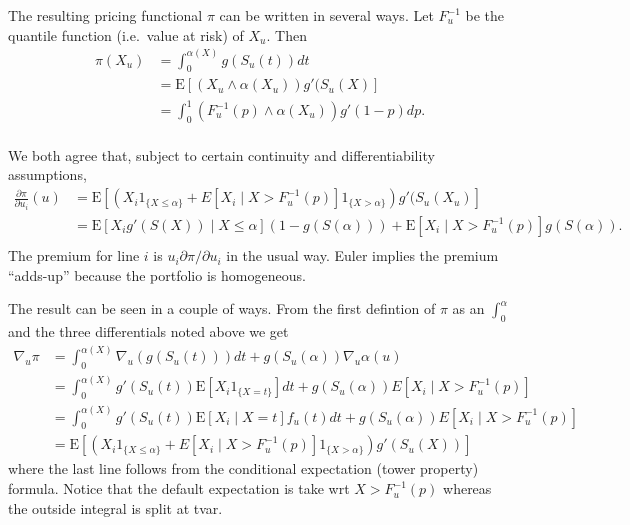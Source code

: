 The resulting pricing functional \(\pi\) can be written in several ways.
Let \(F_u^{-1}\) be the quantile function (i.e.~value at risk) of
\(X_u\). Then \[
\begin{align}
\pi(X_u) &= \int_0^{\alpha(X)} g(S_u(t))dt \\
&= \text{E}[(X_u\wedge \alpha(X_u)) g'(S_u(X)] \\
&= \int_0^1 (F_u^{-1}(p)\wedge \alpha(X_u)) g'(1-p)dp. \\
\end{align}
\]

We both agree that, subject to certain continuity and differentiability
assumptions, \[
\begin{align}
\frac{\partial\pi}{\partial u_i}(u) &= \text{E}\left[\left(X_i 1_{\{X\le \alpha\}} + E[X_i\mid X >  F_u^{-1}(p)]1_{\{X > \alpha\}}\right) g'(S_u(X_u) \right] \\
&= \text{E}[ X_i g'(S(X)) \mid X \le \alpha](1-g(S(\alpha)))+ \text{E}[X_i \mid X > F_u^{-1}(p)]g(S(\alpha)).\\
\end{align}
\] The premium for line \(i\) is \(u_i\partial\pi / \partial u_i\) in
the usual way. Euler implies the premium ``adds-up'' because the
portfolio is homogeneous.

The result can be seen in a couple of ways. From the first defintion of
\(\pi\) as an \(\int_0^\alpha\) and the three differentials noted above
we get \[
\begin{align}
\nabla_u\pi &= \int_0^{\alpha(X)} \nabla_u(g(S_u(t)))dt + g(S_u(\alpha))\nabla_u\alpha(u) \\
&=\int_0^{\alpha(X)} g'(S_u(t))\text{E}[X_i 1_{\{X=t\}}] dt + g(S_u(\alpha))E[X_i\mid X> F_u^{-1}(p) ] \\
&=\int_0^{\alpha(X)} g'(S_u(t))\text{E}[X_i \mid X=t] f_u(t) dt + g(S_u(\alpha))E[X_i\mid X> F_u^{-1}(p) ] \\
&=\text{E}\left[\left(X_i 1_{\{X\le \alpha\}} + E[X_i\mid X> F_u^{-1}(p)]1_{\{X > \alpha\}}\right) g'(S_u(X)) \right]
\end{align}
\] where the last line follows from the conditional expectation (tower
property) formula. Notice that the default expectation is take wrt
\(X>F_u^{-1}(p)\) whereas the outside integral is split at tvar.

